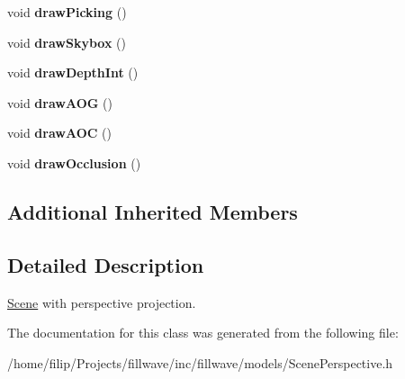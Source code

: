 \begin{DoxyCompactItemize}
\item 
\hypertarget{classfillwave_1_1models_1_1ScenePerspective_aecf1f101bfaca37a108905404855fd08}{}void {\bfseries draw\+Picking} ()\label{classfillwave_1_1models_1_1ScenePerspective_aecf1f101bfaca37a108905404855fd08}

\item 
\hypertarget{classfillwave_1_1models_1_1ScenePerspective_a438528291503a0a90774233e69350f3b}{}void {\bfseries draw\+Skybox} ()\label{classfillwave_1_1models_1_1ScenePerspective_a438528291503a0a90774233e69350f3b}

\item 
\hypertarget{classfillwave_1_1models_1_1ScenePerspective_a896c188e779d446ad593dec48ccb8701}{}void {\bfseries draw\+Depth\+Int} ()\label{classfillwave_1_1models_1_1ScenePerspective_a896c188e779d446ad593dec48ccb8701}

\item 
\hypertarget{classfillwave_1_1models_1_1ScenePerspective_a56bd55710ff020423f1962b8d4a749ef}{}void {\bfseries draw\+A\+O\+G} ()\label{classfillwave_1_1models_1_1ScenePerspective_a56bd55710ff020423f1962b8d4a749ef}

\item 
\hypertarget{classfillwave_1_1models_1_1ScenePerspective_a0aef0292fe2491e20aeeadf87de2363f}{}void {\bfseries draw\+A\+O\+C} ()\label{classfillwave_1_1models_1_1ScenePerspective_a0aef0292fe2491e20aeeadf87de2363f}

\item 
\hypertarget{classfillwave_1_1models_1_1ScenePerspective_ae6fbd583f13e93c0d936620812f7e705}{}void {\bfseries draw\+Occlusion} ()\label{classfillwave_1_1models_1_1ScenePerspective_ae6fbd583f13e93c0d936620812f7e705}

\end{DoxyCompactItemize}
\subsection*{Additional Inherited Members}


\subsection{Detailed Description}
\hyperlink{classfillwave_1_1models_1_1Scene}{Scene} with perspective projection. 

The documentation for this class was generated from the following file\+:\begin{DoxyCompactItemize}
\item 
/home/filip/\+Projects/fillwave/inc/fillwave/models/Scene\+Perspective.\+h\end{DoxyCompactItemize}
